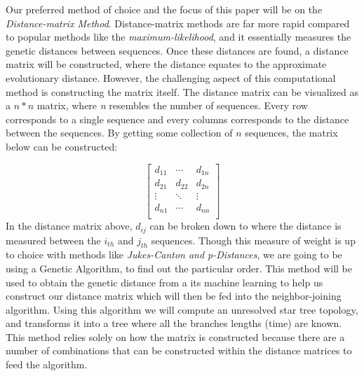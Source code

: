Our preferred method of choice and the focus of this paper will be on the \emph{Distance-matrix Method}. 
Distance-matrix methods are far more rapid compared to popular methods like the  \emph{maximum-likelihood}, and it essentially measures the genetic distances between sequences. 
Once these distances are found, a distance matrix will be constructed, where the distance equates to the approximate evolutionary distance. 
However, the challenging aspect of this computational method is constructing the matrix itself. 
The distance matrix can be visualized as a $n * n$ matrix, where \emph{n} resembles the number of sequences. 
Every row corresponds to a single sequence and every columns corresponds to the distance between the sequences. 
By getting some collection of $n$ sequences, the matrix below can be constructed:

\begin{equation}
\label{Distance-matirx}
\begin{bmatrix} 
d_{11} & \cdots & d_{1n} \\
d_{21} & d_{22} & d_{2n}\\
\vdots & \ddots & \vdots\\
d_{n1} & \cdots & d_{nn} \\
\end{bmatrix}
\end{equation}       
In the distance matrix above, $d_{ij}$ can be broken down to where the distance is measured between the $i_{th}$ and $j_{th}$ sequences. 
Though this measure of weight is up to choice with methods like \emph{Jukes-Canton and p-Distances}, we are going to be using a Genetic Algorithm, to find out the particular order. 
This method will be used to obtain the genetic distance from a its machine learning to help us construct our distance matrix which will then be fed into the neighbor-joining algorithm. 
Using this algorithm we will compute an unresolved star tree topology, and transforms it into a tree where all the branches lengths (time) are known. 
This method relies solely on how the matrix is constructed because there are a number of combinations that can be constructed within the distance matrices to feed the algorithm.      
 
